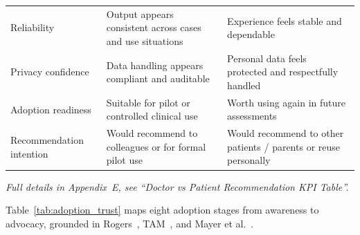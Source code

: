 {\begin{xltabular}{\textwidth}{@{} >{\raggedright\arraybackslash}p{2.0cm} L L @{}}
\addlinespace
Reliability & Output appears consistent across cases and use situations & Experience feels stable and dependable \\
\addlinespace
Privacy confidence & Data handling appears compliant and auditable & Personal data feels protected and respectfully handled \\
\addlinespace
Adoption readiness & Suitable for pilot or controlled clinical use & Worth using again in future assessments \\
\addlinespace
Recommendation intention & Would recommend to colleagues or for formal pilot use & Would recommend to other patients / parents or reuse personally \\
\end{xltabular}}
\fi
\noindent\textit{Full details in Appendix~E, see ``Doctor vs Patient Recommendation KPI Table''.}


\noindent Table~\ref{tab:adoption_trust} maps eight adoption stages from awareness to advocacy, grounded in Rogers~\cite{rogers2003diffusion}, TAM~\cite{davis1989tam}, and Mayer et al.~\cite{mayer1995trust}.



